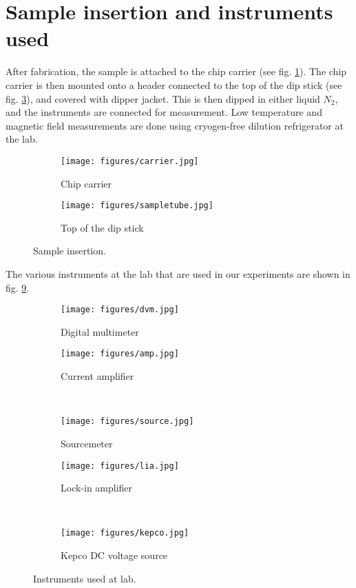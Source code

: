 \label{section:m}
\section{Sample insertion and instruments used}
After fabrication, the sample is attached to the chip carrier (see fig. \ref{fig:carrier}). The chip carrier is then mounted onto a header connected to the top of the dip stick (see fig. \ref{fig:st}), and covered with dipper jacket. This is then dipped in either liquid $N_2$, and the instruments are connected for measurement. Low temperature and magnetic field measurements are done using cryogen-free dilution refrigerator at the lab.

\begin{figure}[H]
	\begin{subfigure}{0.45\linewidth}
		\centering
		\texttt{[image: figures/carrier.jpg]}
		\caption{Chip carrier}
		\label{fig:carrier}
	\end{subfigure}
	\qquad
	\begin{subfigure}{0.45\linewidth}
		\centering
		\texttt{[image: figures/sampletube.jpg]}
		\caption{Top of the dip stick}
		\label{fig:st}
	\end{subfigure}
	\caption{Sample insertion.}
\end{figure}
The various instruments at the lab that are used in our experiments are shown in fig. \ref{fig:inst}.
\begin{figure}[H]
	\begin{subfigure}{0.45\linewidth}
		\centering
		\texttt{[image: figures/dvm.jpg]}
		\caption{Digital multimeter}
		\label{fig:dvm}
	\end{subfigure}
	\qquad
	\begin{subfigure}{0.45\linewidth}
		\centering
		\texttt{[image: figures/amp.jpg]}
		\caption{Current amplifier}
		\label{fig:amp}
	\end{subfigure}
	\\
	\begin{subfigure}{0.45\linewidth}
		\centering
		\texttt{[image: figures/source.jpg]}
		\caption{Sourcemeter}
		\label{fig:source}
	\end{subfigure}
	\qquad
	\begin{subfigure}{0.45\linewidth}
		\centering
		\texttt{[image: figures/lia.jpg]}
		\caption{Lock-in amplifier}
		\label{fig:lia}
	\end{subfigure}
	\\
	\begin{subfigure}{0.45\linewidth}
		\centering
		\texttt{[image: figures/kepco.jpg]}
		\caption{Kepco DC voltage source}
		\label{fig:kepco}
	\end{subfigure}
	\caption{Instruments used at lab.}
	\label{fig:inst}
\end{figure}

